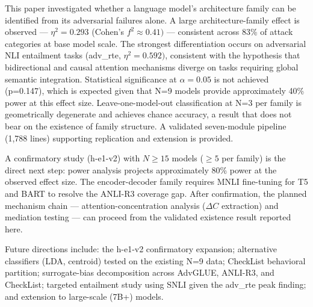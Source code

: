 
This paper investigated whether a language model's architecture family can be identified from its adversarial failures alone. A large architecture-family effect is observed --- $\eta^{2}=0.293$ (Cohen's $f^{2}\approx 0.41)$ --- consistent across 83\% of attack categories at base model scale. The strongest differentiation occurs on adversarial NLI entailment tasks (adv\_rte, $\eta^{2}=0.592)$, consistent with the hypothesis that bidirectional and causal attention mechanisms diverge on tasks requiring global semantic integration. Statistical significance at $\alpha =0.05$ is not achieved (p=0.147), which is expected given that N=9 models provide approximately 40\% power at this effect size. Leave-one-model-out classification at N=3 per family is geometrically degenerate and achieves chance accuracy, a result that does not bear on the existence of family structure. A validated seven-module pipeline (1,788 lines) supporting replication and extension is provided.

A confirmatory study (h-e1-v2) with $N\geq 15$ models ($\geq 5$ per family) is the direct next step: power analysis projects approximately 80\% power at the observed effect size. The encoder-decoder family requires MNLI fine-tuning for T5 and BART to resolve the ANLI-R3 coverage gap. After confirmation, the planned mechanism chain --- attention-concentration analysis ($\Delta C$ extraction) and mediation testing --- can proceed from the validated existence result reported here.

Future directions include: the h-e1-v2 confirmatory expansion; alternative classifiers (LDA, centroid) tested on the existing N=9 data; CheckList behavioral partition; surrogate-bias decomposition across AdvGLUE, ANLI-R3, and CheckList; targeted entailment study using SNLI given the adv\_rte peak finding; and extension to large-scale (7B+) models.

